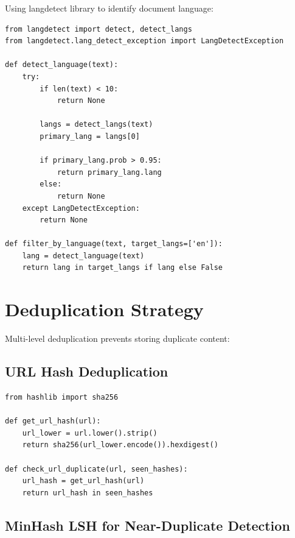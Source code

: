 \documentclass[12pt,a4paper]{report}
\begin{document}
Using langdetect library to identify document language:

\begin{lstlisting}
from langdetect import detect, detect_langs
from langdetect.lang_detect_exception import LangDetectException

def detect_language(text):
    try:
        if len(text) < 10:
            return None
        
        langs = detect_langs(text)
        primary_lang = langs[0]
        
        if primary_lang.prob > 0.95:
            return primary_lang.lang
        else:
            return None
    except LangDetectException:
        return None

def filter_by_language(text, target_langs=['en']):
    lang = detect_language(text)
    return lang in target_langs if lang else False
\end{lstlisting}

\section{Deduplication Strategy}

Multi-level deduplication prevents storing duplicate content:

\subsection{URL Hash Deduplication}

\begin{lstlisting}
from hashlib import sha256

def get_url_hash(url):
    url_lower = url.lower().strip()
    return sha256(url_lower.encode()).hexdigest()

def check_url_duplicate(url, seen_hashes):
    url_hash = get_url_hash(url)
    return url_hash in seen_hashes
\end{lstlisting}

\subsection{MinHash LSH for Near-Duplicate Detection}
\end{document}
